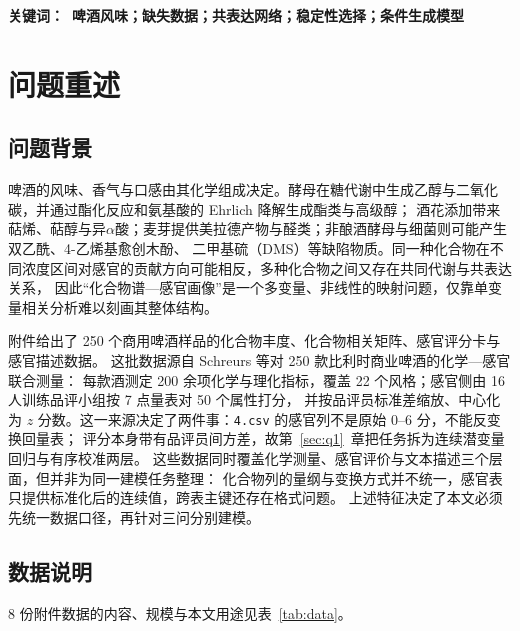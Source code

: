 ﻿\documentclass[UTF8,a4paper,zihao=-4]{ctexart}
\numberwithin{figure}{section}
\numberwithin{table}{section}
\numberwithin{equation}{section}
\newcommand{\file}[1]{\texttt{#1}}
\begin{document}
\vspace{1em}
\noindent\textbf{关键词：\ 啤酒风味；缺失数据；共表达网络；稳定性选择；条件生成模型}
\newpage
\pagestyle{empty}
\tableofcontents  


\newpage
\pagestyle{fancy}
\setcounter{page}{1}

\section{问题重述}
\label{sec:problem}

\subsection{问题背景}

啤酒的风味、香气与口感由其化学组成决定\cite{liu2023}。酵母在糖代谢中生成乙醇与二氧化碳，并通过酯化反应和氨基酸的 Ehrlich 降解生成酯类与高级醇；
酒花添加带来萜烯、萜醇与异$\alpha$酸\cite{lijj2025}；麦芽提供美拉德产物与醛类；非酿酒酵母与细菌则可能产生双乙酰、4-乙烯基愈创木酚、
二甲基硫（DMS）等缺陷物质\cite{vanderhaegen2006}。同一种化合物在不同浓度区间对感官的贡献方向可能相反，多种化合物之间又存在共同代谢与共表达关系，
因此“化合物谱—感官画像”是一个多变量、非线性的映射问题，仅靠单变量相关分析难以刻画其整体结构。

附件给出了 250 个商用啤酒样品的化合物丰度、化合物相关矩阵、感官评分卡与感官描述数据。
这批数据源自 Schreurs 等对 250 款比利时商业啤酒的化学—感官联合测量\cite{schreurs2024}：
每款酒测定 200 余项化学与理化指标，覆盖 22 个风格；感官侧由 16 人训练品评小组按 7 点量表对 50 个属性打分，
并按品评员标准差缩放、中心化为 $z$ 分数。这一来源决定了两件事：\file{4.csv} 的感官列不是原始 0--6 分，不能反变换回量表；
评分本身带有品评员间方差，故第~\ref{sec:q1}~章把任务拆为连续潜变量回归与有序校准两层。
这些数据同时覆盖化学测量、感官评价与文本描述三个层面，但并非为同一建模任务整理：
化合物列的量纲与变换方式并不统一，感官表只提供标准化后的连续值，跨表主键还存在格式问题。
上述特征决定了本文必须先统一数据口径，再针对三问分别建模。

\subsection{数据说明}

8 份附件数据的内容、规模与本文用途见表~\ref{tab:data}。
\end{document}
